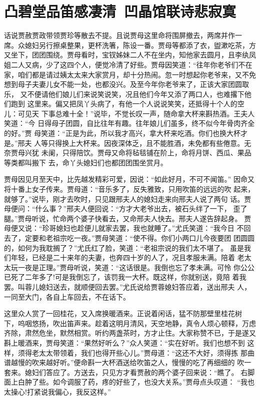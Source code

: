\chapter{凸碧堂品笛感凄清~凹晶馆联诗悲寂寞}

话说贾赦贾政带领贾珍等散去不提。且说贾母这里命将围屏撤去，两席并作一
席。众媳妇另行擦桌整果，更杯洗箸，陈设一番。贾母等都添了衣，盥漱吃茶，方
又坐下，团团围绕。贾母看时，宝钗姊妹二人不在坐内，知他家去圆月，且李纨凤
姐二人又病，少了这四个人，便觉冷清了好些。贾母因笑道：“往年你老爷们不在
家，咱们都是请过姨太太来大家赏月，却十分热闹。忽一时想起你老爷来，又不免
想到母子夫妻儿女不能一处，也都没兴。及至今年你老爷来了，正该大家团圆取乐，
又不便请他们娘儿们来说笑说笑，况且他们今年又添了两口人，也难撂下他们跑到
这里来。偏又把凤丫头病了，有他一个人说说笑笑，还抵得十个人的空儿：可见天
下事总难十全！”说毕，不觉长叹一声，随命拿大杯来斟热酒。王夫人笑道：“今
日得母子团圆，自比往年有趣。往年娘儿们虽多，终不似今年骨肉齐全的好。”贾
母笑道：“正是为此，所以我才高兴，拿大杯来吃酒。你们也换大杯才是。”邢夫
人等只得换上大杯来。因夜深体乏，且不能胜酒，未免都有些倦意。无奈贾母兴犹
未阑，只得陪饮。贾母又命将毡毯铺在阶上，命将月饼、西瓜、果品等类都叫搬下
去，命丫头媳妇们也都团团围坐赏月。

贾母因见月至天中，比先越发精彩可爱，因说：“如此好月，不可不闻笛。”
因命又将十番上女子传来。贾母道：“音乐多了，反失雅致，只用吹笛的远远的吹
起来，就够了。”说毕，刚才去吹时，只见跟邢夫人的媳妇走来向邢夫人说了两句
话。贾母便问：“什么事？”邢夫人便回说：“方才大老爷出去，被石头绊了一下，
歪了腿。”贾母听说，忙命两个婆子快看去，又命邢夫人快去。邢夫人遂告辞起身。
贾母便又说：“珍哥媳妇也趁便儿就家去罢，我也就睡了。”尤氏笑道：“我今日
不回去了，定要和老祖宗吃一夜。”贾母笑道：“使不得。你们小两口儿今夜要团
团圆圆的，如何为我耽搁了？”尤氏红了脸，笑道：“老祖宗说的我们太不堪了。
虽是我们年轻，已经是二十来年的夫妻，也奔四十岁的人了，况且孝服未满。陪着
老太太玩一夜是正理。”贾母听说，笑道：“这话很是。我倒也忘了孝未满。可怜
你公公已死了二年多了!可是我倒忘了，该罚我一大杯。既这样，你就别送，竟陪
着我罢。叫蓉儿媳妇送去，就顺便回去罢。”尤氏说给贾蓉媳妇答应着，送出邢夫
人，一同至大门，各自上车回去，不在话下。

这里众人赏了一回桂花，又入席换暖酒来。正说着闲话，猛不防那壁里桂花树
下，呜咽悠扬，吹出笛声来。趁着这明月清风，天空地静，真令人烦心顿释，万虑
齐除，肃然危坐，默然相赏。听约两盏茶时，方才止住。大家称赞不已，于是遂又
斟上暖酒来，贾母笑道：“果然好听么？”众人笑道：“实在好听。我们也想不到
这样，须得老太太带领着，我们也得开些心儿。”贾母道：“这还不大好，须得拣
那曲谱越慢的吹来越好听。”便命斟一大杯酒送给吹笛之人，慢慢的吃了再细细的
吹一套来。媳妇们答应了。方送去，只见方才看贾赦的两个婆子回来说：“瞧了。
右脚面上白肿了些。如今调服了药，疼的好些了，也没大关系。”贾母点头叹道：
“我也太操心!打紧说我偏心，我反这样。”

